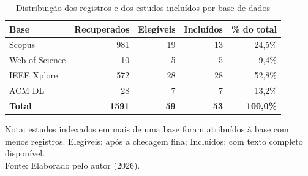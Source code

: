 \begin{table}[htbp]
\centering
\caption{Distribuição dos registros e dos estudos incluídos por base de dados}
\label{tab:map-bases}
\begin{tabular}{lrrrr}
\toprule
\textbf{Base} & \textbf{Recuperados} & \textbf{Elegíveis} & \textbf{Incluídos} & \textbf{\% do total} \\
\midrule
Scopus & 981 & 19 & 13 & 24,5\% \\
Web of Science & 10 & 5 & 5 & 9,4\% \\
IEEE Xplore & 572 & 28 & 28 & 52,8\% \\
ACM DL & 28 & 7 & 7 & 13,2\% \\
\midrule
\textbf{Total} & \textbf{1591} & \textbf{59} & \textbf{53} & \textbf{100,0\%} \\
\bottomrule
\end{tabular}
\par\medskip\footnotesize
Nota: estudos indexados em mais de uma base foram atribuídos à base com menos registros. Elegíveis: após a checagem fina; Incluídos: com texto completo disponível.\\
Fonte: Elaborado pelo autor (2026).
\end{table}
